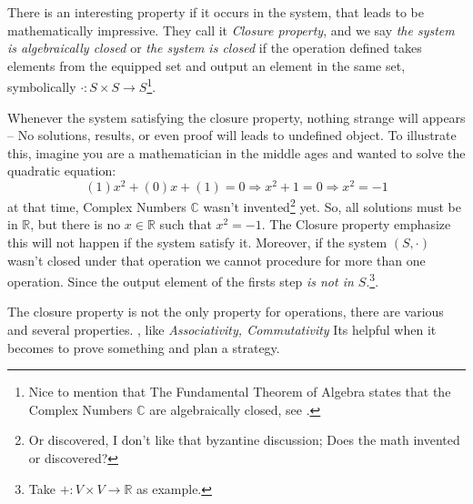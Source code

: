 There is an interesting property if it occurs in the system, that leads to be mathematically impressive. They call it {\it Closure property}, and we say {\it the system is algebraically closed} or {\it the system is closed} if the operation defined takes elements from the equipped set and output an element in the same set, symbolically $\cdot: S\times S\longrightarrow S$\footnote{Nice to mention that The Fundamental Theorem of Algebra states that the Complex Numbers $\mathbb{C}$ are algebraically closed, see \cite{enwiki:1023272575}.}.

Whenever the system satisfying the closure property, nothing strange will appears -- No solutions, results, or even proof will leads to undefined object. To illustrate this, imagine you are a mathematician in the middle ages and wanted to solve the quadratic equation: $$(1)x^2+(0)x+(1)=0 \Longrightarrow x^{2}+1=0 \Longrightarrow x^{2}=-1$$ 
at that time, Complex Numbers $\mathbb{C}$ wasn't invented\footnote{Or discovered, I don't like that byzantine discussion; Does the math invented or discovered?} yet. So, all solutions must be in $\mathbb{R}$, but there is no $x \in \mathbb{R}$ such that $x^{2}=-1$. The Closure property emphasize this will not happen if the system satisfy it.
Moreover, if the system $(S,\cdot)$ wasn't closed under that operation we cannot procedure for more than one operation. Since the output element of the firsts step  {\it is not in $S$}.\footnote{Take $+:V\times V\longrightarrow \mathbb{R}$ as example.}. 

The closure property is not the only property for operations, there are various and several properties. , like {\it Associativity, Commutativity } Its helpful when it becomes to prove something and plan a strategy.